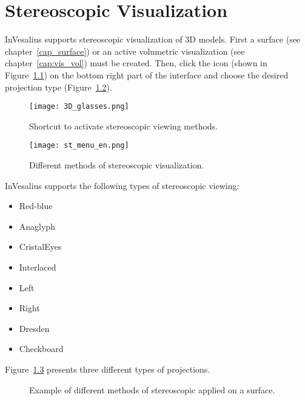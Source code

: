 \chapter{Stereoscopic Visualization}

InVesalius supports stereoscopic visualization of 3D models. First a surface (see chapter~\ref{cap_surface}) or an active volumetric visualization (see chapter~\ref{cap:vis_vol}) must be created. Then, click the icon (shown in Figure~\ref{fig:ster}) on the bottom right part of the interface and choose the desired projection type (Figure~\ref{fig:st_menu}).


\begin{figure}[!htb]
\centering
\texttt{[image: 3D\_glasses.png]}
\caption{Shortcut to activate stereoscopic viewing methods.}
\label{fig:ster}
\end{figure}

\begin{figure}[!htb]
\centering
\texttt{[image: st\_menu\_en.png]}
\caption{Different methods of stereoscopic visualization.}
\label{fig:st_menu}
\end{figure}

InVesalius supports the following types of stereoscopic viewing:

\begin{itemize}
	\item Red-blue
	\item Anaglyph
	\item CristalEyes
	\item Interlaced
	\item Left
	\item Right
	\item Dresden
	\item Checkboard
\end{itemize}

Figure~\ref{fig:st_surf_methods} presents three different types of projections.


\begin{figure}[!htb]
  \centering
   \qquad
   \qquad
  \hfill
  \caption{Example of different methods of stereoscopic applied on a surface.}
  \label{fig:st_surf_methods}
\end{figure}